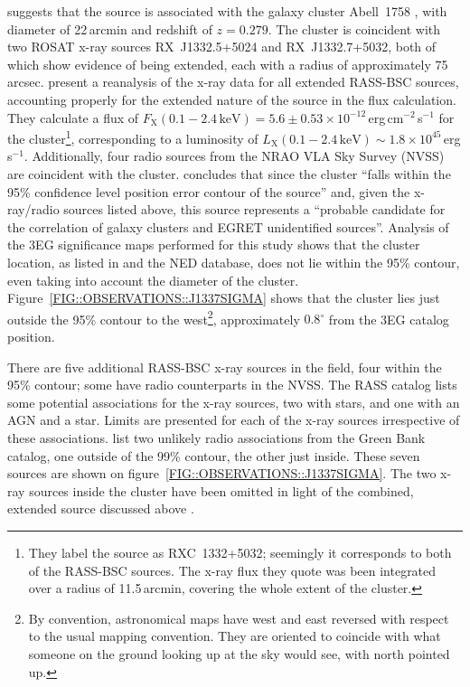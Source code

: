 \citet{REF::COLAFRANCESCO::AA2002} suggests that the \Gray source is
associated with the galaxy cluster Abell~1758
\citep{REF::ABELL::APJS1989}, with diameter of 22\,arcmin and
redshift of $z=0.279$. The cluster is coincident with two ROSAT x-ray
sources RX~J1332.5+5024 and RX~J1332.7+5032, both of which show
evidence of being extended, each with a radius of approximately
75\,arcsec. \citet{REF::BOHRINGER::APJS2000} present a reanalysis of
the x-ray data for all extended RASS-BSC sources, accounting properly
for the extended nature of the source in the flux calculation. They
calculate a flux of
$F_{\mathrm{X}}(0.1-2.4\,\mathrm{keV})=5.6\pm0.53\times10^{-12}$\,erg\,cm$^{-2}$\,s$^{-1}$
for the cluster\footnote{They label the source as RXC~1332+5032;
seemingly it corresponds to both of the RASS-BSC sources. The x-ray
flux they quote was been integrated over a radius of 11.5\,arcmin,
covering the whole extent of the cluster.}, corresponding to a
luminosity of
$L_{\mathrm{X}}(0.1-2.4\,\mathrm{keV})\sim1.8\times10^{45}$\,erg\,s$^{-1}$.
Additionally, four radio sources from the NRAO VLA Sky Survey (NVSS) are
coincident with the cluster. \citet{REF::COLAFRANCESCO::AA2002}
concludes that since the cluster ``falls within the 95\% confidence
level position error contour of the source'' and, given the x-ray/radio
sources listed above, this source represents a ``probable candidate for
the correlation of galaxy clusters and EGRET unidentified \Gray
sources''.  Analysis of the 3EG significance maps performed for this
study shows that the cluster location, as listed in
\citet{REF::ABELL::APJS1989} and the NED database, does not lie within
the 95\% contour, even taking into account the diameter of the
cluster.  Figure~\ref{FIG::OBSERVATIONS::J1337SIGMA} shows that the
cluster lies just outside the 95\% contour to the west\footnote{By
convention, astronomical maps have west and east reversed with respect
to the usual mapping convention. They are oriented to coincide with
what someone on the ground looking up at the sky would see, with north
pointed up.}, approximately $0.8^\circ$ from the 3EG catalog position.

There are five additional RASS-BSC x-ray sources in the field, four
within the 95\% contour; some have radio counterparts in the NVSS.
The RASS catalog lists some potential associations for the x-ray
sources, two with stars, and one with an AGN and a star. Limits are
presented for each of the x-ray sources irrespective of these
associations. \citet{REF::MATTOX::APJS2001} list two unlikely radio
associations from the Green Bank catalog, one outside of the 99\%
contour, the other just inside. These seven sources are shown on
figure~\ref{FIG::OBSERVATIONS::J1337SIGMA}. The two x-ray sources
inside the cluster have been omitted in light of the combined,
extended source discussed above \citep{REF::BOHRINGER::APJS2000}.

